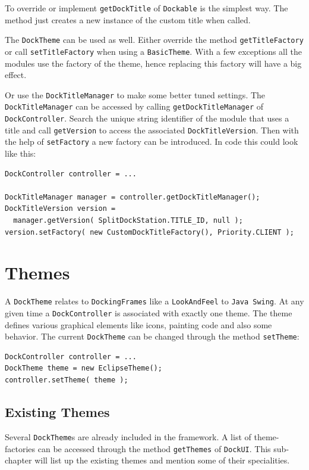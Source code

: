 \documentclass[a4paper,10pt]{article}
\newcommand{\src}[1]{\texttt{#1}}
\begin{document}
To override or implement \src{getDockTitle} of \src{Dockable} is the simplest way. The method just creates a new instance of the custom title when called.

The \src{DockTheme} can be used as well. Either override the method \linebreak \src{getTitleFactory} or call \src{setTitleFactory} when using a \src{BasicTheme}. With a few exceptions all the modules use the factory of the theme, hence replacing this factory will have a big effect.

Or use the \src{DockTitleManager} to make some better tuned settings. The \linebreak \src{DockTitleManager} can be accessed by calling \src{getDockTitleManager} of \linebreak \src{DockController}. Search the unique string identifier of the module that uses a title and call \src{getVersion} to access the associated \src{DockTitleVersion}. Then with the help of \src{setFactory} a new factory can be introduced. In code this could look like this:
\begin{lstlisting}
DockController controller = ...

DockTitleManager manager = controller.getDockTitleManager();
DockTitleVersion version =
  manager.getVersion( SplitDockStation.TITLE_ID, null );
version.setFactory( new CustomDockTitleFactory(), Priority.CLIENT );
\end{lstlisting}

\section{Themes}
A \src{DockTheme} relates to \src{DockingFrames} like a \src{LookAndFeel} to \src{Java Swing}. At any given time a \src{DockController} is associated with exactly one theme. The theme defines various graphical elements like icons, painting code and also some behavior. The current \src{DockTheme} can be changed through the method \src{setTheme}:
\begin{lstlisting}
DockController controller = ...
DockTheme theme = new EclipseTheme();
controller.setTheme( theme );
\end{lstlisting}

\subsection{Existing Themes}
Several \src{DockTheme}s are already included in the framework. A list of theme-factories can be accessed through the method \src{getThemes} of \src{DockUI}. This sub-chapter will list up the existing themes and mention some of their specialities.
\end{document}
